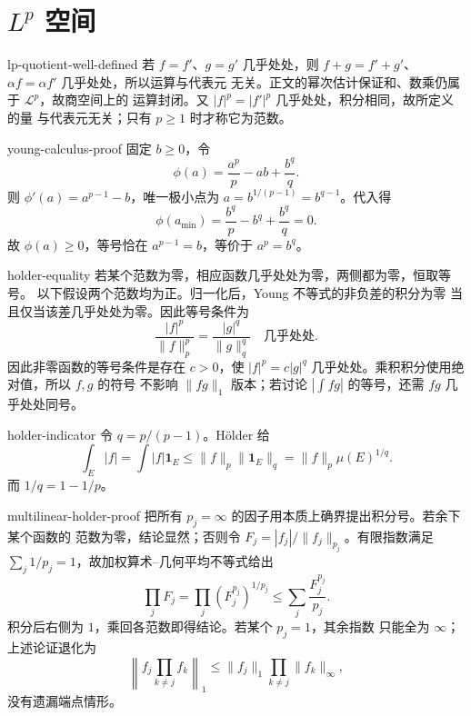 \chapter{\texorpdfstring{\(L^p\)}{Lp} 空间}

\begin{solution}{lp-quotient-well-defined}
若 \(f=f'\)、\(g=g'\) 几乎处处，则
\(f+g=f'+g'\)、\(\alpha f=\alpha f'\) 几乎处处，所以运算与代表元
无关。正文的幂次估计保证和、数乘仍属于 \(\mathcal L^p\)，故商空间上的
运算封闭。又 \(|f|^p=|f'|^p\) 几乎处处，积分相同，故所定义的量
与代表元无关；只有 \(p\ge1\) 时才称它为范数。
\end{solution}

\begin{solution}{young-calculus-proof}
固定 \(b\ge0\)，令
\[
 \phi(a)=\frac{a^p}{p}-ab+\frac{b^q}{q}.
\]
则 \(\phi'(a)=a^{p-1}-b\)，唯一极小点为
\(a=b^{1/(p-1)}=b^{q-1}\)。代入得
\[
 \phi(a_{\min})
 =\frac{b^q}{p}-b^q+\frac{b^q}{q}=0.
\]
故 \(\phi(a)\ge0\)，等号恰在
\(a^{p-1}=b\)，等价于 \(a^p=b^q\)。
\end{solution}

\begin{solution}{holder-equality}
若某个范数为零，相应函数几乎处处为零，两侧都为零，恒取等号。
以下假设两个范数均为正。归一化后，Young 不等式的非负差的积分为零
当且仅当该差几乎处处为零。因此等号条件为
\[
 \frac{|f|^p}{\|f\|_p^p}
 =\frac{|g|^q}{\|g\|_q^q}
\quad\text{几乎处处}.
\]
因此非零函数的等号条件是存在 \(c>0\)，使
\(|f|^p=c|g|^q\) 几乎处处。乘积积分使用绝对值，所以 \(f,g\) 的符号
不影响 \(\|fg\|_1\) 版本；若讨论
\(|\int fg|\) 的等号，还需 \(fg\) 几乎处处同号。
\end{solution}

\begin{solution}{holder-indicator}
令 \(q=p/(p-1)\)。Hölder 给
\[
 \int_E|f|=\int|f|\mathbf1_E
 \le\|f\|_p\|\mathbf1_E\|_q
 =\|f\|_p\mu(E)^{1/q}.
\]
而 \(1/q=1-1/p\)。
\end{solution}

\begin{solution}{multilinear-holder-proof}
把所有 \(p_j=\infty\) 的因子用本质上确界提出积分号。若余下某个函数的
范数为零，结论显然；否则令
\(F_j=|f_j|/\|f_j\|_{p_j}\)。有限指数满足
\(\sum_j1/p_j=1\)，故加权算术--几何平均不等式给出
\[
 \prod_jF_j
 =\prod_j(F_j^{p_j})^{1/p_j}
 \le\sum_j\frac{F_j^{p_j}}{p_j}.
\]
积分后右侧为 \(1\)，乘回各范数即得结论。若某个 \(p_j=1\)，其余指数
只能全为 \(\infty\)；上述论证退化为
\[
 \left\|f_j\prod_{k\ne j}f_k\right\|_1
 \le\|f_j\|_1\prod_{k\ne j}\|f_k\|_\infty,
\]
没有遗漏端点情形。
\end{solution}

